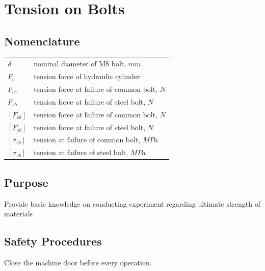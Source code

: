 \chapter{Tension on Bolts}
\section{Nomenclature}
\begin{tabular}[t]{lp{8cm}}
		$ d $ & nominal diameter of M8 bolt, $ mm $\\
		$ F_c $ & tension force of hydraulic cylinder\\
		$ F_{cb} $ & tension force at failure of common bolt, $ N $\\
		$ F_{sb} $ & tension force at failure of steel bolt, $ N $\\
		$ [F_{cb}] $ & tension force at failure of common bolt, $ N $\\
		$ [F_{sb}] $ & tension force at failure of steel bolt, $ N $\\
		$ [\sigma_{cb}] $ & tension at failure of common bolt, $ MPa $\\
		$ [\sigma_{sb}] $ & tension at failure of steel bolt, $ MPa $\\
		
\end{tabular}

\section{Purpose}
Provide basic knowledge on conducting experiment regarding ultimate strength of materials

\section{Safety Procedures}
Close the machine door before every operation.

